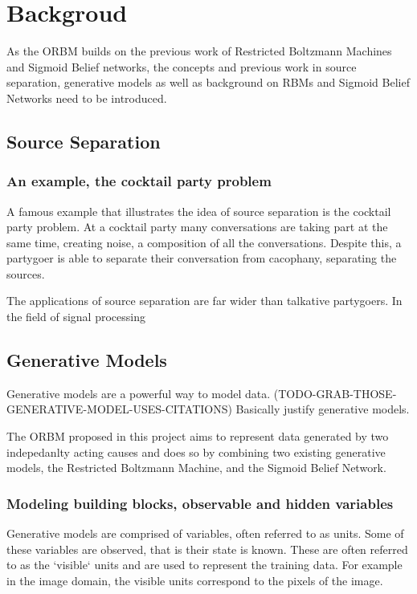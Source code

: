 \chapter{Backgroud}

 As the ORBM builds on the previous work of Restricted Boltzmann Machines and Sigmoid Belief networks, the concepts and previous work in source separation, generative models as well as background on RBMs and Sigmoid Belief Networks need to be introduced.

\section{Source Separation}

\subsection{An example, the cocktail party problem}
A famous example that illustrates the idea of source separation is the cocktail party problem. At a cocktail party many conversations are taking part at the same time, creating noise, a composition of all the conversations. Despite this, a partygoer is able to separate their conversation from cacophany, separating the sources.

The applications of source separation are far wider than talkative partygoers. In the field of signal processing
\todo%

\section{Generative Models}

Generative models are a powerful way to model data.
\todo%
(TODO-GRAB-THOSE-GENERATIVE-MODEL-USES-CITATIONS) Basically justify generative models.

The ORBM proposed in this project aims to represent data generated by two indepedanlty acting causes and does so by combining two existing generative models, the Restricted Boltzmann Machine, and the Sigmoid Belief Network.

\subsection{Modeling building blocks, observable and hidden variables}

Generative models are comprised of variables, often referred to as units. Some of these variables are observed, that is their state is known. These are often referred to as the `visible` units and are used to represent the training data. For example in the image domain, the visible units correspond to the pixels of the image.

